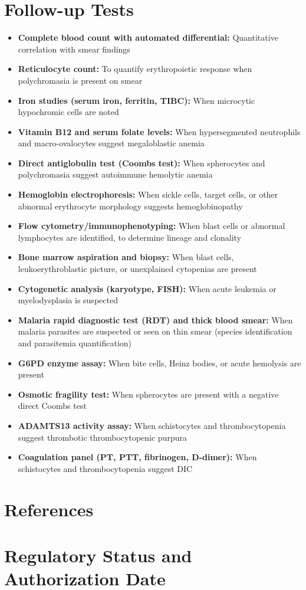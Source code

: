 \section*{Follow-up Tests}
\begin{itemize}
  \item \textbf{Complete blood count with automated differential:} Quantitative correlation with smear findings
  \item \textbf{Reticulocyte count:} To quantify erythropoietic response when polychromasia is present on smear
  \item \textbf{Iron studies (serum iron, ferritin, TIBC):} When microcytic hypochromic cells are noted
  \item \textbf{Vitamin B12 and serum folate levels:} When hypersegmented neutrophils and macro-ovalocytes suggest megaloblastic anemia
  \item \textbf{Direct antiglobulin test (Coombs test):} When spherocytes and polychromasia suggest autoimmune hemolytic anemia
  \item \textbf{Hemoglobin electrophoresis:} When sickle cells, target cells, or other abnormal erythrocyte morphology suggests hemoglobinopathy
  \item \textbf{Flow cytometry/immunophenotyping:} When blast cells or abnormal lymphocytes are identified, to determine lineage and clonality
  \item \textbf{Bone marrow aspiration and biopsy:} When blast cells, leukoerythroblastic picture, or unexplained cytopenias are present
  \item \textbf{Cytogenetic analysis (karyotype, FISH):} When acute leukemia or myelodysplasia is suspected
  \item \textbf{Malaria rapid diagnostic test (RDT) and thick blood smear:} When malaria parasites are suspected or seen on thin smear (species identification and parasitemia quantification)
  \item \textbf{G6PD enzyme assay:} When bite cells, Heinz bodies, or acute hemolysis are present
  \item \textbf{Osmotic fragility test:} When spherocytes are present with a negative direct Coombs test
  \item \textbf{ADAMTS13 activity assay:} When schistocytes and thrombocytopenia suggest thrombotic thrombocytopenic purpura
  \item \textbf{Coagulation panel (PT, PTT, fibrinogen, D-dimer):} When schistocytes and thrombocytopenia suggest DIC
\end{itemize}

\section*{References}



\clearpage
\section*{Regulatory Status and Authorization Date}

\clearpage
